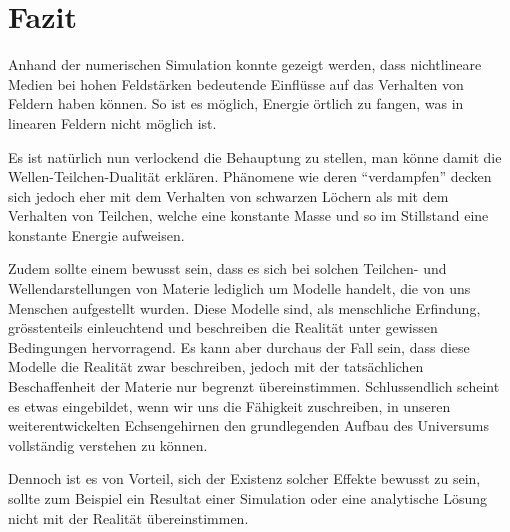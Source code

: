 %
%
%
%
\section{Fazit\label{particles:section:fazit}}

Anhand der numerischen Simulation konnte gezeigt werden, dass nichtlineare Medien bei hohen Feldstärken bedeutende Einflüsse auf das Verhalten von Feldern haben können.
So ist es möglich, Energie örtlich zu fangen, was in linearen Feldern nicht möglich ist.

Es ist natürlich nun verlockend die Behauptung zu stellen, man könne damit die Wellen-Teilchen-Dualität erklären.
Phänomene wie deren ``verdampfen'' decken sich jedoch eher mit dem Verhalten von schwarzen Löchern als mit dem Verhalten von Teilchen, welche eine konstante Masse und so im Stillstand eine konstante Energie aufweisen.

Zudem sollte einem bewusst sein, dass es sich bei solchen Teilchen- und Wellendarstellungen von Materie lediglich um Modelle handelt, die von uns Menschen aufgestellt wurden.
Diese Modelle sind, als menschliche Erfindung, grösstenteils einleuchtend und beschreiben die Realität unter gewissen Bedingungen hervorragend.
Es kann aber durchaus der Fall sein, dass diese Modelle die Realität zwar beschreiben, jedoch mit der tatsächlichen Beschaffenheit der Materie nur begrenzt übereinstimmen.
Schlussendlich scheint es etwas eingebildet, wenn wir uns die Fähigkeit zuschreiben, in unseren weiterentwickelten Echsengehirnen den grundlegenden Aufbau des Universums vollständig verstehen zu können.

Dennoch ist es von Vorteil, sich der Existenz solcher Effekte bewusst zu sein, sollte zum Beispiel ein Resultat einer Simulation oder eine analytische Lösung nicht mit der Realität übereinstimmen.
